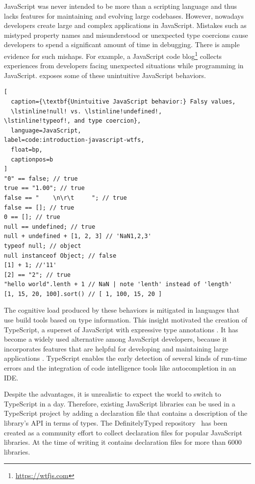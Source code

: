 \documentclass[sigconf]{acmart}
\begin{document}
JavaScript was never intended to be more than a
scripting language and thus lacks features for maintaining and evolving large
codebases. However, nowadays developers create large and complex
applications in JavaScript. 
Mistakes such as mistyped property
names and misunderstood or unexpected type coercions cause developers
to spend a significant amount of time in debugging. There is ample
evidence for such mishaps. For example, a 
JavaScript code blog\footnote{\url{https://wtfjs.com}} collects experiences
from developers facing unexpected situations while programming in
JavaScript.  exposes some
of these unintuitive JavaScript behaviors. 

\begin{lstlisting}[
  caption={\textbf{Unintuitive JavaScript behavior:} Falsy values,
  \lstinline!null! vs. \lstinline!undefined!,
\lstinline!typeof!, and type coercion},
  language=JavaScript,
label=code:introduction-javascript-wtfs,
  float=bp,
  captionpos=b
]
"0" == false; // true
true == "1.00"; // true
false == "    \n\r\t     "; // true
false == []; // true
0 == []; // true
null == undefined; // true
null + undefined + [1, 2, 3] // 'NaN1,2,3' 
typeof null; // object
null instanceof Object; // false
[1] + 1; //'11'
[2] == "2"; // true
"hello world".lenth + 1 // NaN | note 'lenth' instead of 'length'
[1, 15, 20, 100].sort() // [ 1, 100, 15, 20 ]
\end{lstlisting}

The cognitive load produced by these behaviors is mitigated in languages that use
build tools based on type information. This insight motivated the
creation of TypeScript, a superset of JavaScript with expressive type
annotations \cite{typescript}. It has become a widely used alternative
among JavaScript developers, because it incorporates features that are
helpful for developing and maintaining large applications
\cite{DBLP:conf/icse/GaoBB17}. TypeScript enables the early detection
of several kinds of run-time errors and the integration of code intelligence
tools like autocompletion in an IDE.

Despite the advantages, it is unrealistic to expect the world to
switch to TypeScript in a day. Therefore, 
existing JavaScript libraries can be used in a TypeScript project by
adding a declaration file that contains a description of the library's
API in terms of types. 
The DefinitelyTyped repository~\cite{definitely-typed-repository} has
been created as a community effort to collect declaration files for
popular JavaScript libraries. At the time of writing it contains
declaration files for more than 6000 libraries.
\end{document}
